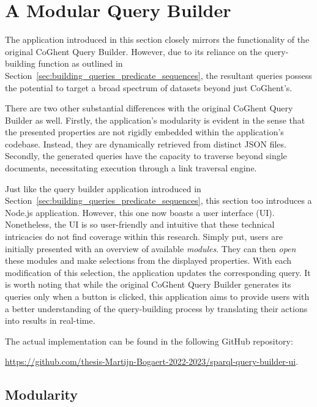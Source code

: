 \section{A Modular Query Builder}
\label{sec:new_query_builder}

The application introduced in this section closely mirrors the functionality of the original CoGhent Query Builder. However, due to its reliance on the query-building function as outlined in Section~\ref{sec:building_queries_predicate_sequences}, the resultant queries possess the potential to target a broad spectrum of datasets beyond just CoGhent's.

There are two other substantial differences with the original CoGhent Query Builder as well. Firstly, the application's modularity is evident in the sense that the presented properties are not rigidly embedded within the application's codebase. Instead, they are dynamically retrieved from distinct JSON files. Secondly, the generated queries have the capacity to traverse beyond single documents, necessitating execution through a link traversal engine.

Just like the query builder application introduced in Section~\ref{sec:building_queries_predicate_sequences}, this section too introduces a Node.js application. However, this one now boasts a user interface (UI). Nonetheless, the UI is so user-friendly and intuitive that these technical intricacies do not find coverage within this research. Simply put, users are initially presented with an overview of available \textit{modules}. They can then \textit{open} these modules and make selections from the displayed properties. With each modification of this selection, the application updates the corresponding query. It is worth noting that while the original CoGhent Query Builder generates its queries only when a button is clicked, this application aims to provide users with a better understanding of the query-building process by translating their actions into results in real-time.

The actual implementation can be found in the following GitHub repository:
\begin{center}
    \url{https://github.com/thesis-Martijn-Bogaert-2022-2023/sparql-query-builder-ui}.
\end{center}

\subsection{Modularity}

